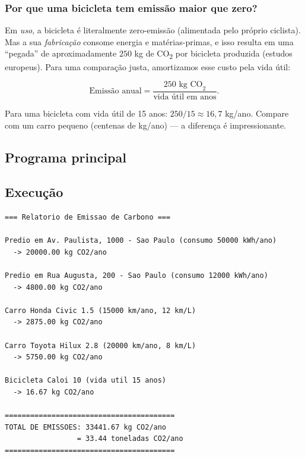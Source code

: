 \documentclass[11pt,a4paper]{article}
\begin{document}
\subsubsection*{Por que uma bicicleta tem emiss\~ao maior que zero?}

Em \emph{uso}, a bicicleta \'e literalmente zero-emiss\~ao (alimentada pelo pr\'oprio ciclista). Mas a sua \emph{fabrica\c{c}\~ao} consome energia e mat\'erias-primas, e isso resulta em uma ``pegada'' de aproximadamente $250$ kg de CO\textsubscript{2} por bicicleta produzida (estudos europeus). Para uma compara\c{c}\~ao justa, amortizamos esse custo pela vida \'util:

\[
\text{Emiss\~ao anual} = \frac{250 \text{ kg CO}_2}{\text{vida \'util em anos}}.
\]

Para uma bicicleta com vida \'util de 15 anos: $250/15 \approx 16{,}7$ kg/ano. Compare com um carro pequeno (centenas de kg/ano) --- a diferen\c{c}a \'e impressionante.

\subsection*{Programa principal}



\subsection*{Execu\c{c}\~ao}

\begin{saidabox}
\begin{lstlisting}[style=terminal]
=== Relatorio de Emissao de Carbono ===

Predio em Av. Paulista, 1000 - Sao Paulo (consumo 50000 kWh/ano)
  -> 20000.00 kg CO2/ano

Predio em Rua Augusta, 200 - Sao Paulo (consumo 12000 kWh/ano)
  -> 4800.00 kg CO2/ano

Carro Honda Civic 1.5 (15000 km/ano, 12 km/L)
  -> 2875.00 kg CO2/ano

Carro Toyota Hilux 2.8 (20000 km/ano, 8 km/L)
  -> 5750.00 kg CO2/ano

Bicicleta Caloi 10 (vida util 15 anos)
  -> 16.67 kg CO2/ano

========================================
TOTAL DE EMISSOES: 33441.67 kg CO2/ano
                 = 33.44 toneladas CO2/ano
========================================
\end{lstlisting}
\end{saidabox}
\end{document}
